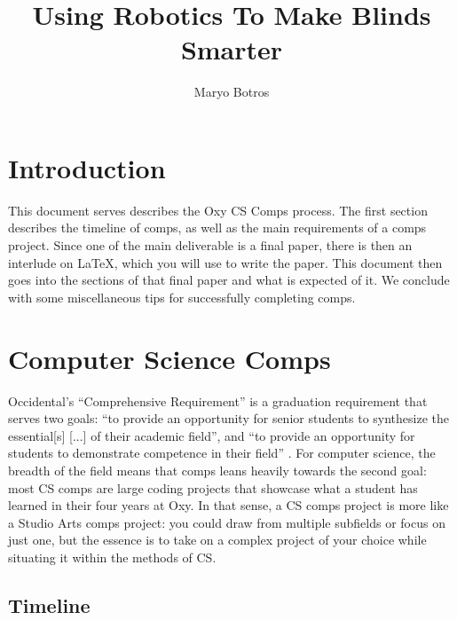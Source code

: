 \documentclass[10pt,twocolumn]{article}
\title{Using Robotics To Make Blinds Smarter}
\author{Maryo Botros}
\affiliation{Occidental College}
\begin{document}
\maketitle

\section{Introduction}

This document serves describes the Oxy CS Comps process.
The first section describes the timeline of comps, as well as the main requirements of a comps project.
Since one of the main deliverable is a final paper, there is then an interlude on {\LaTeX}, which you will use to write the paper.
This document then goes into the sections of that final paper and what is expected of it.
We conclude with some miscellaneous tips for successfully completing comps.

\section{Computer Science Comps}

Occidental's ``Comprehensive Requirement'' is a graduation requirement that serves two goals: ``to provide an opportunity for senior students to synthesize the essential[s] [...] of their academic field'', and ``to provide an opportunity for students to demonstrate competence in their field'' \cite{OccidentalComps}.
For computer science, the breadth of the field means that comps leans heavily towards the second goal: most CS comps are large coding projects that showcase what a student has learned in their four years at Oxy.
In that sense, a CS comps project is more like a Studio Arts comps project: you could draw from multiple subfields or focus on just one, but the essence is to take on a complex project of your choice while situating it within the methods of CS.

\subsection{Timeline}
\end{document}
